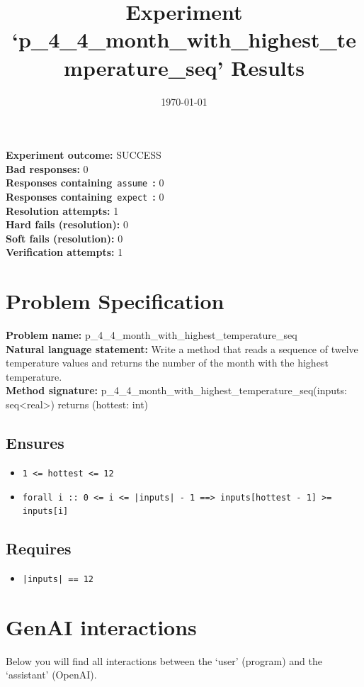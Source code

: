 \documentclass{article}
\begin{document}
\title{Experiment `p\_4\_4\_month\_with\_highest\_temperature\_seq' Results}
\author{\today}
\date{}
\maketitle
\textbf{Experiment outcome: }SUCCESS
\\\textbf{Bad responses: }0
\\\textbf{Responses containing}~\texttt{assume}~\textbf{: }0
\\\textbf{Responses containing}~\texttt{expect}~\textbf{: }0
\\\textbf{Resolution attempts: }1
\\\textbf{Hard fails (resolution): }0
\\\textbf{Soft fails (resolution): }0
\\\textbf{Verification attempts: }1
\section*{Problem Specification}
\textbf{Problem name: }p\_4\_4\_month\_with\_highest\_temperature\_seq
\\\textbf{Natural language statement: }Write a method that reads a sequence of twelve temperature values and returns the number of the month with the highest temperature.
\\\textbf{Method signature: }p\_4\_4\_month\_with\_highest\_temperature\_seq(inputs: seq<real>) returns (hottest: int)
\subsection*{Ensures}
\begin{itemize}
\item \texttt{1 <= hottest <= 12}
\item \texttt{forall i :: 0 <= i <= |inputs| - 1 ==> inputs[hottest - 1] >= inputs[i]}
\end{itemize}
\subsection*{Requires}
\begin{itemize}
\item \texttt{|inputs| == 12}
\end{itemize}
\clearpage
\section*{GenAI interactions}
Below you will find all interactions between the `user' (program) and the `assistant' (OpenAI).
\end{document}
